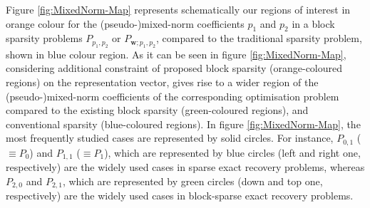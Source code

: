 Figure \ref{fig:MixedNorm-Map} represents schematically our regions of interest in orange colour for the (pseudo-)mixed-norm coefficients $p_1$ and $p_2$ in a block sparsity problems $P_{p_1,p_2}$ or $P_{\boldsymbol{w};p_1,p_2}$, compared to the traditional sparsity problem, shown in blue colour region. 
As it can be seen in figure \ref{fig:MixedNorm-Map}, considering additional constraint of proposed block sparsity (orange-coloured regions) on the representation vector, gives rise to a wider region of the (pseudo-)mixed-norm coefficients of the corresponding optimisation problem compared to the existing block sparsity (green-coloured regions), and conventional sparsity (blue-coloured regions).
In figure \ref{fig:MixedNorm-Map}, the most frequently studied cases are represented by solid circles. 
For instance, $P_{0,1}$ (${\equiv} P_0$) and $P_{1,1}$ (${\equiv} P_1$), which are represented by blue circles (left and right one, respectively) are the widely used cases in sparse exact recovery problems, whereas $P_{2,0}$ and $P_{2,1}$, which are represented by green circles (down and top one, respectively) are the widely used cases in block-sparse exact recovery problems.
\newpage



\FloatBarrier

